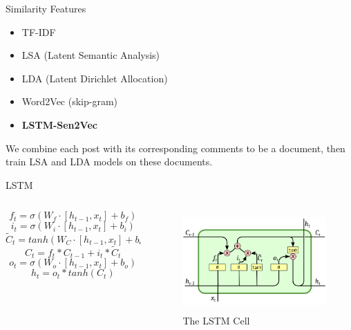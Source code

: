 \documentclass[aspectratio=169]{beamer}
\begin{document}
    \begin{frame}{Similarity Features}
      \begin{itemize}
        \item TF-IDF
        \item LSA (Latent Semantic Analysis)
        \item LDA (Latent Dirichlet Allocation)
        \item Word2Vec (skip-gram)
        \item \textbf{LSTM-Sen2Vec }
      \end{itemize}

      We combine each post with its corresponding comments to be a document, then train LSA and LDA models on these documents.
    \end{frame}

    \begin{frame}{LSTM}
      \begin{columns}
      \begin{column}[t]{0.5\textwidth}
        \begin{equation}
           f_t = \sigma(W_f \cdot [h_{t-1}, x_t] + b_f)
        \end{equation}
        \begin{equation}
           i_t = \sigma(W_i \cdot [h_{t-1}, x_t] + b_i)
        \end{equation}
        \begin{equation}
           \tilde{C}_t = tanh(W_C \cdot [h_{t-1}, x_t] + b_C) 
        \end{equation}
        \begin{equation}
           C_t = f_t * C_{t-1} + i_t * \tilde{C}_t
        \end{equation}
        \begin{equation}
           o_t = \sigma(W_o \cdot [h_{t-1}, x_t] + b_o)
        \end{equation}
        \begin{equation}
           h_t = o_t * tanh(C_t)
        \end{equation}
      \end{column}

      \begin{column}[t]{0.5\textwidth}
        \begin{figure}
        \includegraphics[height=1.5in, width=2.44in]{lstm2.png}
        \caption{The LSTM Cell}
        \end{figure}
      \end{column}


\end{columns}
\end{frame}
\end{document}
